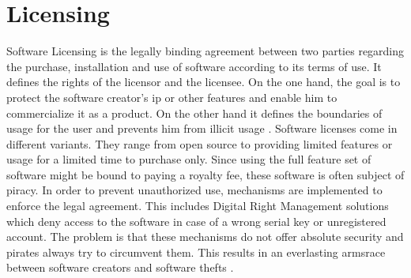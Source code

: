 \section{Licensing} \label{subsection:introduction-licensing}
Software Licensing is the legally binding agreement between two parties regarding the purchase, installation and use of software according to its terms of use.
It defines the rights of the licensor and the licensee.
On the one hand, the goal is to protect the software creator's \gls{ip} or other features and enable him to commercialize it as a product.
On the other hand it defines the boundaries of usage for the user and prevents him from illicit usage \cite{uncgLicensing}.
\newline
\newline
Software licenses come in different variants.
They range from open source to providing limited features or usage for a limited time to purchase only.
Since using the full feature set of software might be bound to paying a royalty fee, these software is often subject of piracy.
In order to prevent unauthorized use, mechanisms are implemented to enforce the legal agreement.
This includes Digital Right Management solutions which deny access to the software in case of a wrong serial key or unregistered account.
\newline
\newline
The problem is that these mechanisms do not offer absolute security and pirates always try to circumvent them.
This results in an everlasting armsrace between software creators and software thefts \cite{szCopy}.
